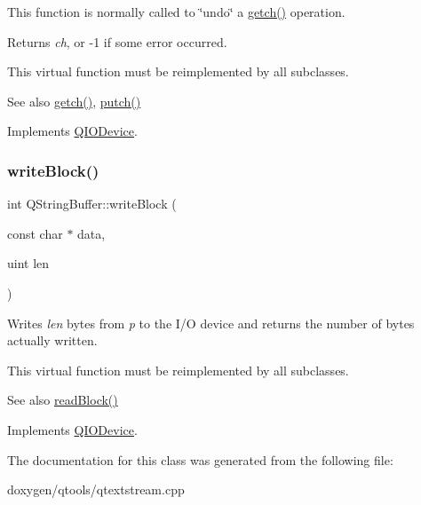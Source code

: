 This function is normally called to \char`\"{}undo\char`\"{} a \mbox{\hyperlink{class_q_string_buffer_acebe86e5beeaff3863673fc56089e2da}{getch()}} operation.

Returns {\itshape ch}, or -\/1 if some error occurred.

This virtual function must be reimplemented by all subclasses.

\begin{DoxySeeAlso}{See also}
\mbox{\hyperlink{class_q_string_buffer_acebe86e5beeaff3863673fc56089e2da}{getch()}}, \mbox{\hyperlink{class_q_string_buffer_ac95cff6e837ae523527b9d78cb6a4074}{putch()}} 
\end{DoxySeeAlso}


Implements \mbox{\hyperlink{class_q_i_o_device_aae3d67422103e8fc0411297b1d62c29a}{Q\+I\+O\+Device}}.

\mbox{\label{class_q_string_buffer_a4c17bf2b2702b837ba614bd92ad0d7a2}} 
\subsubsection{\texorpdfstring{writeBlock()}{writeBlock()}}
{\footnotesize\ttfamily int Q\+String\+Buffer\+::write\+Block (\begin{DoxyParamCaption}\item[{const char $\ast$}]{data,  }\item[{uint}]{len }\end{DoxyParamCaption})\hspace{0.3cm}{\ttfamily [virtual]}}

Writes {\itshape len} bytes from {\itshape p} to the I/O device and returns the number of bytes actually written.

This virtual function must be reimplemented by all subclasses.

\begin{DoxySeeAlso}{See also}
\mbox{\hyperlink{class_q_string_buffer_a6cda82dda018af5291df80676eb037a4}{read\+Block()}} 
\end{DoxySeeAlso}


Implements \mbox{\hyperlink{class_q_i_o_device_a5d937df1bde2f956872dd54e077807d1}{Q\+I\+O\+Device}}.



The documentation for this class was generated from the following file\+:\begin{DoxyCompactItemize}
\item 
doxygen/qtools/qtextstream.\+cpp\end{DoxyCompactItemize}
